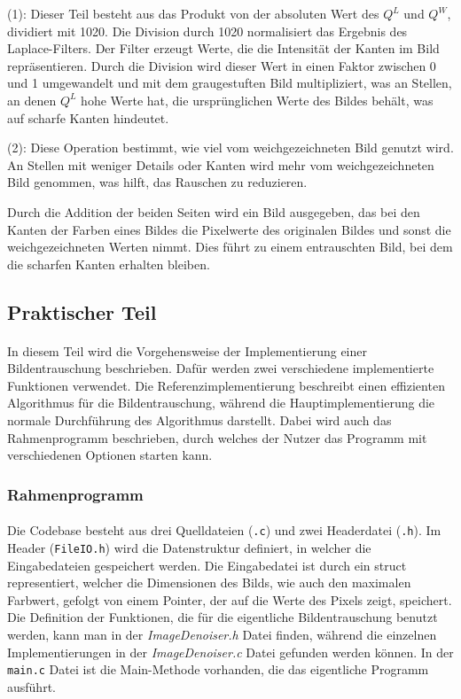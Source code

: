 \documentclass[course=erap]{aspdoc}
\begin{document}
(1): Dieser Teil besteht aus das Produkt von der absoluten Wert des \(Q^L\) und \(Q^W\), dividiert mit 1020. 
Die Division durch 1020 normalisiert das Ergebnis des Laplace-Filters. Der Filter erzeugt Werte, die die Intensität 
der Kanten im Bild repräsentieren. Durch die Division wird dieser Wert in einen Faktor zwischen 0 und 1 umgewandelt 
und mit dem graugestuften Bild multipliziert, was an Stellen, an denen \(Q^L\) hohe Werte hat, die ursprünglichen
Werte des Bildes behält, was auf scharfe Kanten hindeutet.

(2): Diese Operation bestimmt, wie viel vom weichgezeichneten Bild genutzt wird. An Stellen mit weniger Details oder
Kanten wird mehr vom weichgezeichneten Bild genommen, was hilft, das Rauschen zu reduzieren.

Durch die Addition der beiden Seiten wird ein Bild ausgegeben, das bei den Kanten der Farben eines Bildes die Pixelwerte des originalen Bildes und sonst die weichgezeichneten Werten nimmt. Dies führt zu einem entrauschten Bild, bei dem die scharfen Kanten erhalten bleiben.

\subsection{Praktischer Teil}
\paragraph{}
In diesem Teil wird die Vorgehensweise der Implementierung einer Bildentrauschung beschrieben. Dafür werden zwei verschiedene 
implementierte Funktionen verwendet. Die Referenzimplementierung beschreibt einen effizienten Algorithmus für die Bildentrauschung, 
während die Hauptimplementierung die normale Durchführung des Algorithmus darstellt. Dabei wird auch das Rahmenprogramm beschrieben, 
durch welches der Nutzer das Programm mit verschiedenen Optionen starten kann.

\subsubsection*{Rahmenprogramm}
\paragraph{}
Die Codebase besteht aus drei Quelldateien (\verb|.c|) und zwei  Headerdatei (\verb|.h|). Im Header (\verb|FileIO.h|) wird die Datenstruktur definiert, in welcher die Eingabedateien gespeichert werden. Die Eingabedatei ist durch ein struct representiert, welcher die Dimensionen des Bilds, wie auch den maximalen Farbwert, gefolgt von einem Pointer, der auf die Werte des Pixels zeigt, speichert. Die Definition der Funktionen, die für die eigentliche Bildentrauschung benutzt werden, kann man in der \textit{ImageDenoiser.h} Datei finden, während die einzelnen Implementierungen in der \textit{ImageDenoiser.c} Datei gefunden werden können. In der \verb|main.c| Datei ist die Main-Methode vorhanden, die das eigentliche Programm ausführt.
\end{document}
